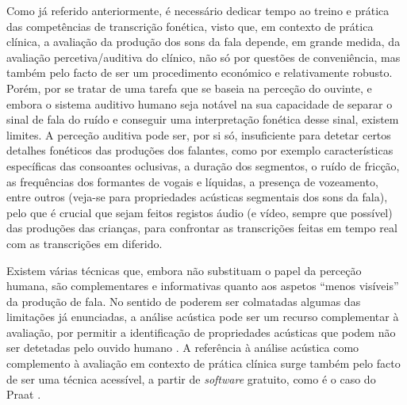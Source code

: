 \documentclass[output=paper,colorlinks,citecolor=brown,booklanguage=portuguese]{langscibook}
\begin{document}
Como já referido anteriormente, é necessário dedicar tempo ao treino e prática das competências de transcrição fonética, visto que, em contexto de prática clínica, a avaliação da produção dos sons da fala depende, em grande medida, da avaliação percetiva/auditiva do clínico, não só por questões de conveniência, mas também pelo facto de ser um procedimento económico e relativamente robusto. Porém, por se tratar de uma tarefa que se baseia na perceção do ouvinte, e embora o sistema auditivo humano seja notável na sua capacidade de separar o sinal de fala do ruído e conseguir uma interpretação fonética desse sinal, existem limites. A perceção auditiva pode ser, por si só, insuficiente para detetar certos detalhes fonéticos das produções dos falantes, como por exemplo características específicas das consoantes oclusivas, a duração dos segmentos, o ruído de fricção, as frequências dos formantes de vogais e líquidas, a presença de vozeamento, entre outros (veja-se \citealp{Mateus2016} para propriedades acústicas segmentais dos sons da fala), pelo que é crucial que sejam feitos registos áudio (e vídeo, sempre que possível) das produções das crianças, para confrontar as transcrições feitas em tempo real com as transcrições em diferido.

Existem várias técnicas que, embora não substituam o papel da perceção humana, são complementares e informativas quanto aos aspetos “menos visíveis” da produção de fala. No sentido de poderem ser colmatadas algumas das limitações já enunciadas, a análise acústica pode ser um recurso complementar à avaliação, por permitir a identificação de propriedades acústicas que podem não ser detetadas pelo ouvido humano \citep{Kent2010, Wertzner2017, Stemberger2019}. A referência à análise acústica como complemento à avaliação em contexto de prática clínica surge também pelo facto de ser uma técnica acessível, a partir de \emph{software} gratuito, como é o caso do Praat \citep{Boersma2020}.
\end{document}
